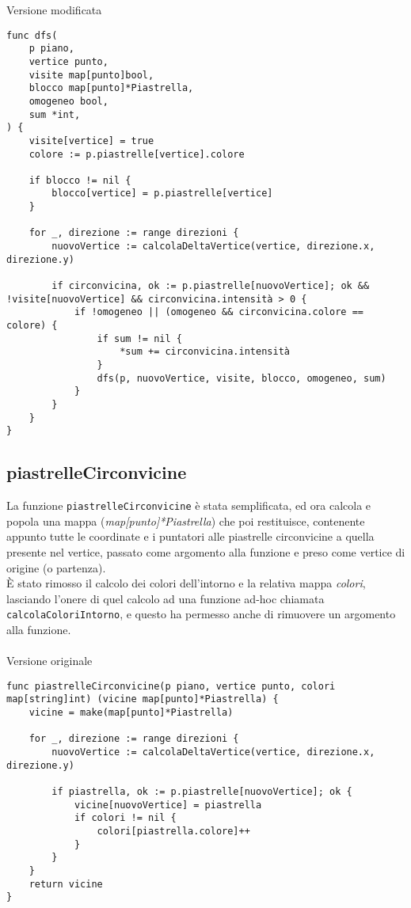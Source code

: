 \documentclass{article}
\begin{document}
Versione modificata
\begin{verbatim}
func dfs(
	p piano,
	vertice punto,
	visite map[punto]bool,
	blocco map[punto]*Piastrella,
	omogeneo bool,
	sum *int,
) {
	visite[vertice] = true
	colore := p.piastrelle[vertice].colore

	if blocco != nil {
		blocco[vertice] = p.piastrelle[vertice]
	}

	for _, direzione := range direzioni {
		nuovoVertice := calcolaDeltaVertice(vertice, direzione.x, direzione.y)

		if circonvicina, ok := p.piastrelle[nuovoVertice]; ok && !visite[nuovoVertice] && circonvicina.intensità > 0 {
			if !omogeneo || (omogeneo && circonvicina.colore == colore) {
				if sum != nil {
					*sum += circonvicina.intensità
				}
				dfs(p, nuovoVertice, visite, blocco, omogeneo, sum)
			}
		}
	}
}
\end{verbatim}

\subsection{piastrelleCirconvicine}\label{subsec:circonvicine}
La funzione \texttt{piastrelleCirconvicine} è stata semplificata, ed ora calcola e popola una mappa (\textit{map[punto]*Piastrella}) che poi restituisce, contenente appunto tutte le coordinate e i puntatori alle piastrelle circonvicine a quella presente nel vertice, passato come argomento alla funzione e preso come vertice di origine (o partenza).\\
È stato rimosso il calcolo dei colori dell'intorno e la relativa mappa \textit{colori}, lasciando l'onere di quel calcolo ad una funzione ad-hoc chiamata \texttt{calcolaColoriIntorno}, e questo ha permesso anche di rimuovere un argomento alla funzione.
\\ \\
Versione originale
\begin{verbatim}
func piastrelleCirconvicine(p piano, vertice punto, colori map[string]int) (vicine map[punto]*Piastrella) {
	vicine = make(map[punto]*Piastrella)

	for _, direzione := range direzioni {
		nuovoVertice := calcolaDeltaVertice(vertice, direzione.x, direzione.y)

		if piastrella, ok := p.piastrelle[nuovoVertice]; ok {
			vicine[nuovoVertice] = piastrella
			if colori != nil {
				colori[piastrella.colore]++
			}
		}
	}
	return vicine
}
\end{verbatim}
\end{document}
